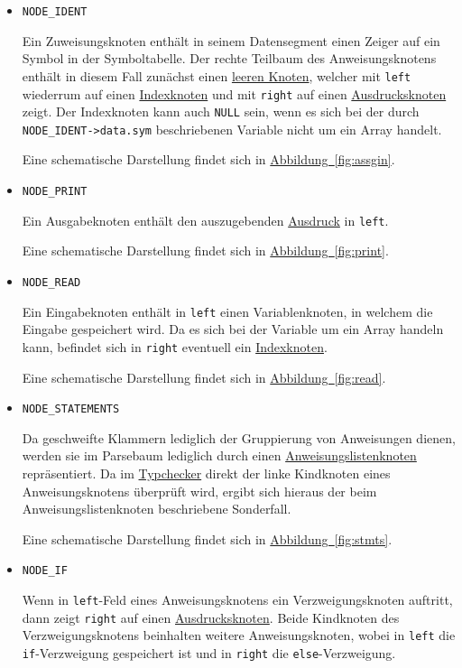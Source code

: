 \begin{itemize}
\item \texttt{NODE\_IDENT}

Ein Zuweisungsknoten enthält in seinem Datensegment einen Zeiger auf ein Symbol in der Symboltabelle.
Der rechte Teilbaum des Anweisungsknotens enthält in diesem Fall zunächst einen \hyperref[sec:nonenode]{leeren Knoten},
welcher mit \texttt{left} wiederrum auf einen \hyperref[sec:indexnode]{Indexknoten} und mit \texttt{right} auf einen \hyperref[sec:expnode]{Ausdrucksknoten} zeigt.
Der Indexknoten kann auch \texttt{NULL} sein,
wenn es sich bei der durch \texttt{NODE\_IDENT->data.sym} beschriebenen Variable nicht um ein Array handelt.

Eine schematische Darstellung findet sich in \hyperref[fig:assgin]{Abbildung~\ref{fig:assgin}}.

\item \texttt{NODE\_PRINT}

Ein Ausgabeknoten enthält den auszugebenden \hyperref[sec:expnode]{Ausdruck} in \texttt{left}.

Eine schematische Darstellung findet sich in \hyperref[fig:print]{Abbildung~\ref{fig:print}}.

\item \texttt{NODE\_READ}

Ein Eingabeknoten enthält in \texttt{left} einen Variablenknoten,
in welchem die Eingabe gespeichert wird.
Da es sich bei der Variable um ein Array handeln kann,
befindet sich in \texttt{right} eventuell ein \hyperref[sec:indexnode]{Indexknoten}.

Eine schematische Darstellung findet sich in \hyperref[fig:read]{Abbildung~\ref{fig:read}}.
\item \texttt{NODE\_STATEMENTS}

Da geschweifte Klammern lediglich der Gruppierung von Anweisungen dienen,
werden sie im Parsebaum lediglich durch einen \hyperref[sec:stmtsnode]{Anweisungslistenknoten} repräsentiert.
Da im \hyperref[sec:typecheck]{Typchecker} direkt der linke Kindknoten eines Anweisungsknotens überprüft wird,
ergibt sich hieraus der beim Anweisungslistenknoten beschriebene Sonderfall.

Eine schematische Darstellung findet sich in \hyperref[fig:stmts]{Abbildung~\ref{fig:stmts}}.

\item \texttt{NODE\_IF}

Wenn in \texttt{left}-Feld eines Anweisungsknotens ein Verzweigungsknoten auftritt,
dann zeigt \texttt{right} auf einen \hyperref[sec:expnode]{Ausdrucksknoten}.
Beide Kindknoten des Verzweigungsknotens beinhalten weitere Anweisungsknoten,
wobei in \texttt{left} die \texttt{if}-Verzweigung gespeichert ist und in \texttt{right} die \texttt{else}-Verzweigung.


\end{itemize}
